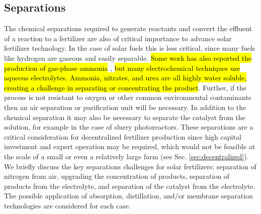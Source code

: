 \subsection{Separations}
\label{sec:separation}

The chemical separations required to generate reactants and convert the effluent of a reaction to a fertilizer are also of critical importance to advance solar fertilizer technology. In the case of solar fuels this is less critical, since many fuels like hydrogen are gaseous and easily separable. \hl{Some work has also reported the production of gas-phase ammonia} \cite{Furuya_1989,lan2013synthesis,Kyriakou_2017}, \hl{but many electrochemical techniques use aqueous electrolytes. Ammonia, nitrates, and urea are all highly water soluble, creating a challenge in separating or concentrating the product}. %
Further, if the process is not resistant to oxygen or other common environmental contaminants then an air separation or purification unit will be necessary. In addition to the chemical separation it may also be necessary to separate the catalyst from the solution, for example in the case of slurry photoreactors. These separations are a critical consideration for decentralized fertilizer production since high capital investment and expert operation may be required, which would not be feasible at the scale of a small or even a relatively large farm (see Sec. \ref{sec:decentralized}). We briefly discuss the key separations challenges for solar fertilizers: separation of nitrogen from air, upgrading the concentration of products, separation of products from the electrolyte, and separation of the catalyst from the electrolyte. The possible application of absorption, distillation, and/or membrane separation technologies are considered for each case.

